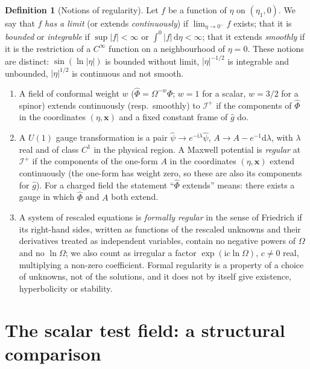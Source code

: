 \documentclass[11pt,a4paper]{article}
\theoremstyle{definition}
\newtheorem{definition}{Definition}
\newcommand{\scri}{\mathscr{I}^{+}}
\newcommand{\dd}{\mathrm{d}}
\newcommand{\ii}{\mathrm{i}}
\newcommand{\hg}{\hat g}
\newcommand{\hpsi}{\hat\psi}
\begin{document}
\begin{definition}[Notions of regularity]
\label{def:reg}
Let $f$ be a function of $\eta$ on $(\eta_{1},0)$. We say that $f$ \emph{has a limit} (or extends \emph{continuously}) if $\lim_{\eta\to0^{-}}f$ exists; that it is \emph{bounded} or \emph{integrable} if $\sup|f|<\infty$ or $\int^{0}|f|\,\dd\eta<\infty$; that it extends \emph{smoothly} if it is the restriction of a $C^{\infty}$ function on a neighbourhood of $\eta=0$. These notions are distinct: $\sin(\ln|\eta|)$ is bounded without limit, $|\eta|^{-1/2}$ is integrable and unbounded, $|\eta|^{1/2}$ is continuous and not smooth.
\begin{enumerate}[label=(\alph*)]
\item A field of conformal weight $w$ ($\hat\Phi=\Omega^{-w}\Phi$; $w=1$ for a scalar, $w=3/2$ for a spinor) extends continuously (resp.\ smoothly) to $\scri$ if the components of $\hat\Phi$ in the coordinates $(\eta,\mathbf{x})$ and a fixed constant frame of $\hg$ do.
\item A $U(1)$ gauge transformation is a pair $\hpsi\to e^{-\ii\lambda}\hpsi$, $A\to A-e^{-1}\dd\lambda$, with $\lambda$ real and of class $C^{1}$ in the physical region. A Maxwell potential is \emph{regular} at $\scri$ if the components of the one-form $A$ in the coordinates $(\eta,\mathbf{x})$ extend continuously (the one-form has weight zero, so these are also its components for $\hg$). For a charged field the statement ``$\hat\Phi$ extends'' means: there exists a gauge in which $\hat\Phi$ and $A$ both extend.
\item A system of rescaled equations is \emph{formally regular} in the sense of Friedrich \cite{Friedrich2015} if its right-hand sides, written as functions of the rescaled unknowns and their derivatives treated as independent variables, contain no negative powers of $\Omega$ and no $\ln\Omega$; we also count as irregular a factor $\exp(\ii c\ln\Omega)$, $c\neq0$ real, multiplying a non-zero coefficient. Formal regularity is a property of a choice of unknowns, not of the solutions, and it does not by itself give existence, hyperbolicity or stability.
\end{enumerate}
\end{definition}

\section{The scalar test field: a structural comparison}
\label{sec:scalar}
\end{document}
